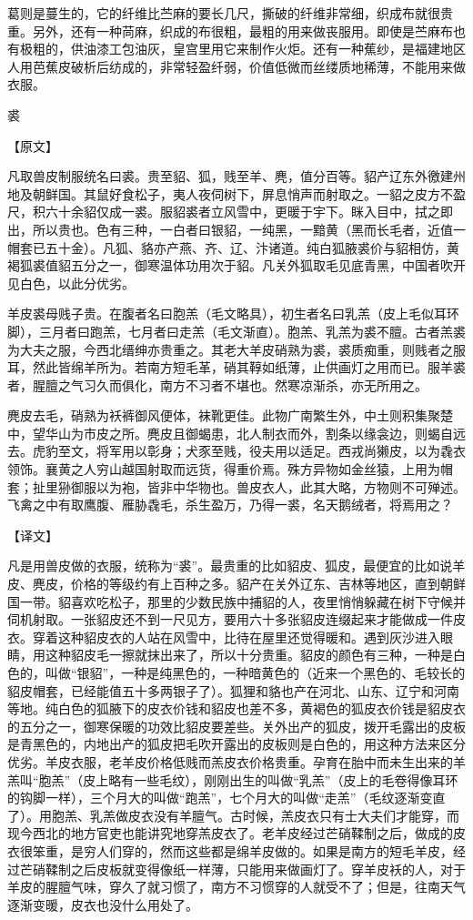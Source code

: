 \documentclass[12pt,UTF8]{ctexbook}
\begin{document}
葛则是蔓生的，它的纤维比苎麻的要长几尺，撕破的纤维非常细，织成布就很贵重。另外，还有一种苘麻，织成的布很粗，最粗的用来做丧服用。即使是苎麻布也有极粗的，供油漆工包油灰，皇宫里用它来制作火炬。还有一种蕉纱，是福建地区人用芭蕉皮破析后纺成的，非常轻盈纤弱，价值低微而丝缕质地稀薄，不能用来做衣服。

裘

【原文】

凡取兽皮制服统名曰裘。贵至貂、狐，贱至羊、麂，值分百等。貂产辽东外徼建州地及朝鲜国。其鼠好食松子，夷人夜伺树下，屏息悄声而射取之。一貂之皮方不盈尺，积六十余貂仅成一裘。服貂裘者立风雪中，更暖于宇下。眯入目中，拭之即出，所以贵也。色有三种，一白者曰银貂，一纯黑，一黯黄（黑而长毛者，近值一帽套已五十金）。凡狐、貉亦产燕、齐、辽、汴诸道。纯白狐腋裘价与貂相仿，黄褐狐裘值貂五分之一，御寒温体功用次于貂。凡关外狐取毛见底青黑，中国者吹开见白色，以此分优劣。

羊皮裘母贱子贵。在腹者名曰胞羔（毛文略具），初生者名曰乳羔（皮上毛似耳环脚），三月者曰跑羔，七月者曰走羔（毛文渐直）。胞羔、乳羔为裘不膻。古者羔裘为大夫之服，今西北缙绅亦贵重之。其老大羊皮硝熟为裘，裘质痴重，则贱者之服耳，然此皆绵羊所为。若南方短毛革，硝其鞟如纸薄，止供画灯之用而已。服羊裘者，腥膻之气习久而俱化，南方不习者不堪也。然寒凉渐杀，亦无所用之。

麂皮去毛，硝熟为袄裤御风便体，袜靴更佳。此物广南繁生外，中土则积集聚楚中，望华山为市皮之所。麂皮且御蝎患，北人制衣而外，割条以缘衾边，则蝎自远去。虎豹至文，将军用以彰身；犬豕至贱，役夫用以适足。西戎尚獭皮，以为毳衣领饰。襄黄之人穷山越国射取而远货，得重价焉。殊方异物如金丝猿，上用为帽套；扯里狲御服以为袍，皆非中华物也。兽皮衣人，此其大略，方物则不可殚述。飞禽之中有取鹰腹、雁胁毳毛，杀生盈万，乃得一裘，名天鹅绒者，将焉用之？

【译文】

凡是用兽皮做的衣服，统称为“裘”。最贵重的比如貂皮、狐皮，最便宜的比如说羊皮、麂皮，价格的等级约有上百种之多。貂产在关外辽东、吉林等地区，直到朝鲜国一带。貂喜欢吃松子，那里的少数民族中捕貂的人，夜里悄悄躲藏在树下守候并伺机射取。一张貂皮还不到一尺见方，要用六十多张貂皮连缀起来才能做成一件皮衣。穿着这种貂皮衣的人站在风雪中，比待在屋里还觉得暖和。遇到灰沙进入眼睛，用这种貂皮毛一擦就抹出来了，所以十分贵重。貂皮的颜色有三种，一种是白色的，叫做“银貂”，一种是纯黑色的，一种暗黄色的（近来一个黑色的、毛较长的貂皮帽套，已经能值五十多两银子了）。狐狸和貉也产在河北、山东、辽宁和河南等地。纯白色的狐腋下的皮衣价钱和貂皮也差不多，黄褐色的狐皮衣价钱是貂皮衣的五分之一，御寒保暖的功效比貂皮要差些。关外出产的狐皮，拨开毛露出的皮板是青黑色的，内地出产的狐皮把毛吹开露出的皮板则是白色的，用这种方法来区分优劣。羊皮衣服，老羊皮价格低贱而羔皮衣价格贵重。孕育在胎中而未生出来的羊羔叫“胞羔”（皮上略有一些毛纹），刚刚出生的叫做“乳羔”（皮上的毛卷得像耳环的钩脚一样），三个月大的叫做“跑羔”，七个月大的叫做“走羔”（毛纹逐渐变直了）。用胞羔、乳羔做皮衣没有羊膻气。古时候，羔皮衣只有士大夫们才能穿，而现今西北的地方官吏也能讲究地穿羔皮衣了。老羊皮经过芒硝鞣制之后，做成的皮衣很笨重，是穷人们穿的，然而这些都是绵羊皮做的。如果是南方的短毛羊皮，经过芒硝鞣制之后皮板就变得像纸一样薄，只能用来做画灯了。穿羊皮袄的人，对于羊皮的腥膻气味，穿久了就习惯了，南方不习惯穿的人就受不了；但是，往南天气逐渐变暖，皮衣也没什么用处了。
\end{document}
